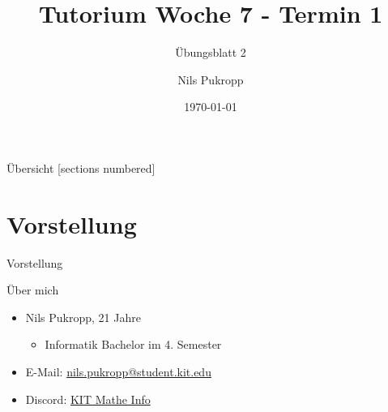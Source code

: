 \documentclass[aspectratio=169]{beamer}
\title{\color{classcolor}Tutorium Woche 7 - Termin 1}
\subtitle{Übungsblatt 2}
\date{\today}
\author{Nils Pukropp}
\institute{INSTITUT FÜR PROGRAMMSTRUKTUREN UND DATENORGANISATION}
\begin{document}
\maketitle

\begin{frame}{Übersicht}
  [sections numbered]
  \tableofcontents[hideallsubsections]
\end{frame}

\section{Vorstellung}
\begin{frame}[fragile]{Vorstellung}
  \begin{block}{Über mich}
  \begin{itemize}
    \item Nils Pukropp, 21 Jahre
    \begin{itemize}
      \item Informatik Bachelor im 4. Semester
    \end{itemize}
    \item E-Mail: \href{mailto:nils.pukropp@student.kit.edu}{nils.pukropp@student.kit.edu}
    \item Discord: \href{https://discord.gg/6GpaFE8w4y}{KIT Mathe Info}
  \end{itemize}
\end{block}
\end{frame}
\end{document}

